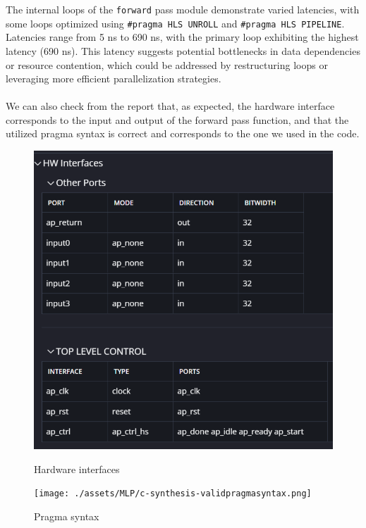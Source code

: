 \documentclass{article}
\begin{document}
The internal loops of the \texttt{forward} pass module demonstrate varied latencies, with some loops optimized using \texttt{\#pragma HLS UNROLL} and \texttt{\#pragma HLS PIPELINE}. Latencies range from 5 ns to 690 ns, with the primary loop exhibiting the highest latency (690 ns). This latency suggests potential bottlenecks in data dependencies or resource contention, which could be addressed by restructuring loops or leveraging more efficient parallelization strategies.
\\\\We can also check from the report that, as expected, the hardware interface corresponds to the input and output of the forward pass function, and that the utilized pragma syntax is correct and corresponds to the one we used in the code.

\begin{figure}[H]
    \centering
    \begin{minipage}{0.49\textwidth}
        \centering
        \includegraphics[width=1\textwidth]{./assets/MLP/c-synthesis-HWinterfaces.png}
        \caption{Hardware interfaces}
        \label{fig:c-synthesis-hw-interfaces}
    \end{minipage}
    \hfill
    \begin{minipage}{0.49\textwidth}
        \centering
        \texttt{[image: ./assets/MLP/c-synthesis-validpragmasyntax.png]}
        \caption{Pragma syntax}
        \label{fig:c-synthesis-pragma-syntax}
    \end{minipage}
\end{figure}
\end{document}
